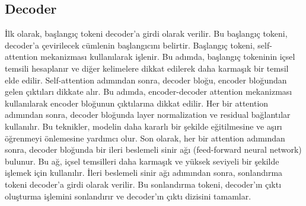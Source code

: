 \subsection{Decoder}
İlk olarak, başlangıç tokeni decoder'a girdi olarak verilir. Bu başlangıç tokeni, decoder'a çevirilecek cümlenin başlangıcını belirtir. Başlangıç tokeni, self-attention mekanizması kullanılarak işlenir. Bu adımda, başlangıç tokeninin içsel temsili hesaplanır ve diğer kelimelere dikkat edilerek daha karmaşık bir temsil elde edilir. Self-attention adımından sonra, decoder bloğu, encoder bloğundan gelen çıktıları dikkate alır. Bu adımda, encoder-decoder attention mekanizması kullanılarak encoder bloğunun çıktılarına dikkat edilir. Her bir attention adımından sonra, decoder bloğunda layer normalization ve residual bağlantılar kullanılır. Bu teknikler, modelin daha kararlı bir şekilde eğitilmesine ve aşırı öğrenmeyi önlemesine yardımcı olur. Son olarak, her bir attention adımından sonra, decoder bloğunda bir ileri beslemeli sinir ağı (feed-forward neural network) bulunur. Bu ağ, içsel temsilleri daha karmaşık ve yüksek seviyeli bir şekilde işlemek için kullanılır. İleri beslemeli sinir ağı adımından sonra, sonlandırma tokeni decoder'a girdi olarak verilir. Bu sonlandırma tokeni, decoder'ın çıktı oluşturma işlemini sonlandırır ve decoder'ın çıktı dizisini tamamlar.

\newpage